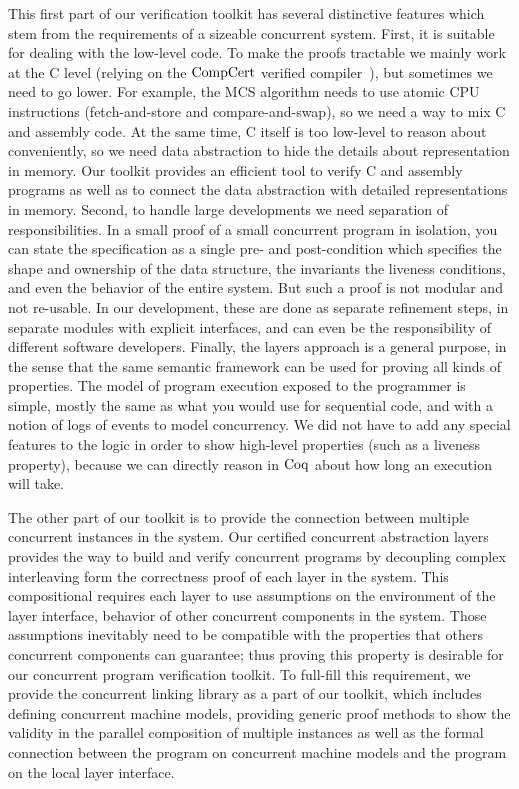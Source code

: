 This first part of our verification toolkit has several distinctive features which stem from the requirements of a sizeable concurrent system. 
 First, it is suitable for dealing with the low-level code. 
 To make the proofs tractable we mainly work at the C level (relying on the $\mathrm{CompCert}$ verified compiler~\cite{compcert}), 
 but sometimes we need to go lower. 
 For example, the MCS algorithm needs to use atomic CPU instructions (fetch-and-store and compare-and-swap), 
 so we need a way to mix C and assembly code. 
 At the same time, C itself is too low-level to reason about conveniently, 
 so we need data abstraction to hide the details about representation in memory.
 Our toolkit provides an efficient tool to verify C and assembly programs as well as to connect the data abstraction with detailed representations in memory. 
Second, to handle large developments we need separation of responsibilities. 
In a small proof of a small concurrent program in isolation, you can state the specification as a single pre- and post-condition 
which specifies the shape and ownership of the data structure, the invariants 
the liveness conditions, and even the behavior of the entire system.
But such a proof is not modular and not re-usable. In our development, these are done as separate refinement steps, 
in separate modules with explicit interfaces, and can even be the responsibility of different software developers.
Finally, the layers approach is a general purpose, in the sense that the same semantic framework can be used for proving all kinds of properties. 
The model of program execution exposed to the programmer is simple, mostly the same as what you would use for sequential code, 
and with a notion of logs of events to model concurrency. 
We did not have to add any special features to the logic in order to show high-level properties (such as a liveness property), 
because we can directly reason in $\mathrm{Coq}$ about how long an execution will take.


The other part of our toolkit is to
provide the connection between multiple concurrent instances in the system.
Our certified concurrent abstraction layers 
provides the way to build and verify 
concurrent programs by decoupling complex interleaving form the correctness proof of each layer in the system.
This compositional requires each layer to use assumptions on the environment of the layer interface, behavior of other concurrent components in the system.
Those assumptions inevitably need to be compatible with 
the properties that others concurrent components can guarantee;
thus proving this property is desirable for our concurrent program verification toolkit. 
To full-fill this requirement, 
we provide the concurrent linking library as a part of our toolkit,
which includes 
defining concurrent machine models, providing generic proof methods to show the validity in the parallel composition of multiple instances 
as well as the formal connection between the program on concurrent machine models and 
the program on the local layer interface. 

